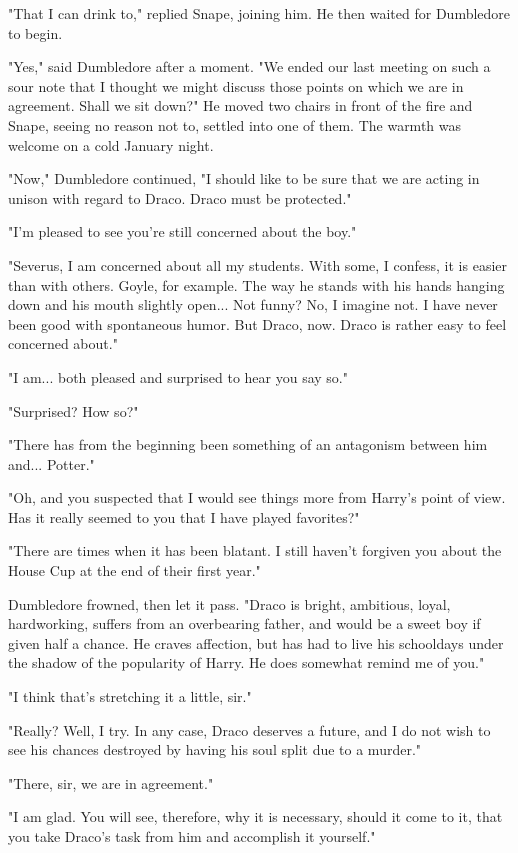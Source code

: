 \documentclass[a4paper,11pt]{article}
\begin{document}
"That I can drink to," replied Snape, joining him. He then waited for Dumbledore to begin.

"Yes," said Dumbledore after a moment. "We ended our last meeting on such a sour note that I thought we might discuss those points on which we are in agreement. Shall we sit down?" He moved two chairs in front of the fire and Snape, seeing no reason not to, settled into one of them. The warmth was welcome on a cold January night.

"Now," Dumbledore continued, "I should like to be sure that we are acting in unison with regard to Draco. Draco must be protected."

"I'm pleased to see you're still concerned about the boy."

"Severus, I am concerned about all my students. With some, I confess, it is easier than with others. Goyle, for example. The way he stands with his hands hanging down and his mouth slightly open... Not funny? No, I imagine not. I have never been good with spontaneous humor. But Draco, now. Draco is rather easy to feel concerned about."

"I am... both pleased and surprised to hear you say so."

"Surprised? How so?"

"There has from the beginning been something of an antagonism between him and... Potter."

"Oh, and you suspected that I would see things more from Harry's point of view. Has it really seemed to you that I have played favorites?"

"There are times when it has been blatant. I still haven't forgiven you about the House Cup at the end of their first year."

Dumbledore frowned, then let it pass. "Draco is bright, ambitious, loyal, hardworking, suffers from an overbearing father, and would be a sweet boy if given half a chance. He craves affection, but has had to live his schooldays under the shadow of the popularity of Harry. He does somewhat remind me of you."

"I think that's stretching it a little, sir."

"Really? Well, I try. In any case, Draco deserves a future, and I do not wish to see his chances destroyed by having his soul split due to a murder."

"There, sir, we are in agreement."

"I am glad. You will see, therefore, why it is necessary, should it come to it, that you take Draco's task from him and accomplish it yourself."
\end{document}
